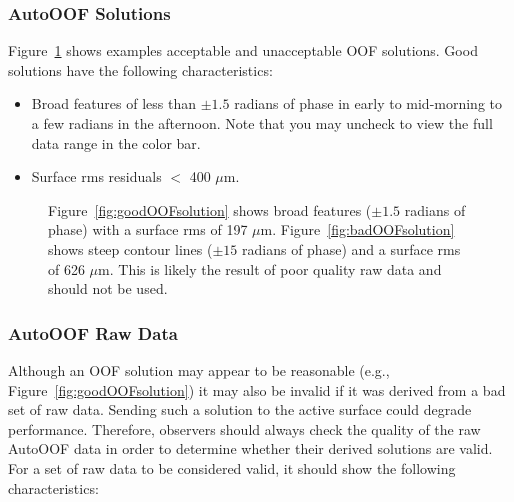 \newpage

\subsubsection{AutoOOF Solutions}\label{sec:AutoOOFsolution}

Figure~\ref{fig:OOFsolution} shows examples acceptable and unacceptable
\gls{OOF} solutions.  Good solutions have the following characteristics:

\begin{itemize}[itemsep=0pt]
\item Broad features of less than $\pm 1.5$ radians of phase in early to mid-morning to a
few radians in the afternoon.  Note that you may uncheck  to view
the full data range in the color bar.
\item Surface rms residuals $<$ 400 $\mu$m.
\end{itemize}

\begin{figure}[!h]
\begin{center}
\hfill
{}
\caption[Comparison of AutoOOF solutions]
{Figure~\ref{fig:goodOOFsolution} shows broad features ($\pm 1.5$ radians
of phase) with a surface rms of 197 $\mu$m.  Figure~\ref{fig:badOOFsolution} shows
steep contour lines ($\pm 15$ radians of phase) and a surface rms of 626 $\mu$m.
This is likely the result of poor quality raw data and should not be used.} 
\label{fig:OOFsolution}
\end{center}
\end{figure}


\subsubsection{AutoOOF Raw Data}

Although an \gls{OOF} solution may appear to be reasonable (e.g.,
Figure~\ref{fig:goodOOFsolution}) it may also be invalid if it was derived
from a bad set of raw data.  Sending such a solution to the active surface could
degrade performance.  Therefore, observers should always check the quality of the
raw AutoOOF data in order to determine whether their derived solutions are valid.
For a set of raw data to be considered valid, it should show the following
characteristics:

